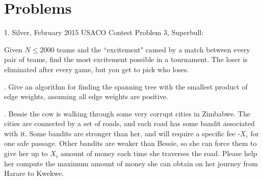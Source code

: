 \documentclass{article}
\begin{document}
\section {Problems}

1. Silver, February 2015 USACO Contest Problem 3, Superbull:

\noindent
Given $N\leq2000$ teams and the ``excitement" caused by a match between every pair of teams, find the most excitement possible in a tournament.  The loser is eliminated after every game, but you get to pick who loses.

. Give an algorithm for finding the spanning tree with the smallest product of edge weights, assuming all edge weights are positive.

. Bessie the cow is walking through some very corrupt cities in Zimbabwe. The cities are
connected by a set of roads, and each road has some bandit associated with it. Some bandits
are stronger than her, and will require a specific fee -$X_i$ for one safe passage. Other bandits
are weaker than Bessie, so she can force them to give her up to $X_i$ amount of money each
time she traverses the road. Please help her compute the maximum amount of money she
can obtain on her journey from Harare to Kwekwe.
\end{document}
